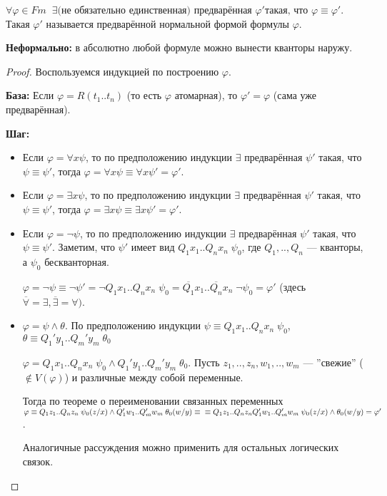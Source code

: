 \documentclass[a4paper, fleqn]{article}
\begin{document}
    \begin{theorem}
        $\forall \varphi \in Fm \;\; \exists \text{(не обязательно единственная) предварённая } \varphi' \text{такая, что } \varphi \equiv \varphi'$. Такая $\varphi'$ называется предварённой нормальной формой формулы $\varphi$.
    \end{theorem}
\vspace{-\baselineskip}
    \textbf{Неформально:} в абсолютно любой формуле можно вынести кванторы наружу.
\vspace{-\baselineskip}
    \begin{proof}
        Воспользуемся индукцией по построению $\varphi$.
        
        \textbf{База: } Если $\varphi = R(t_1..t_n)$ (то есть $\varphi$ атомарная), то $\varphi' = \varphi$ (сама уже предварённая). 
        
        \textbf{Шаг:}
        \begin{itemize}
        \item Если $\varphi = \forall x \psi$, то по предположению индукции $\exists$ предварённая $\psi'$ такая, что $\psi \equiv \psi'$, тогда $\varphi = \forall x \psi \equiv \forall x \psi' = \varphi'$. 
        \item Если $\varphi = \exists x \psi$, то по предположению индукции $\exists$ предварённая $\psi'$ такая, что $\psi \equiv \psi'$, тогда $\varphi = \exists x \psi \equiv \exists x \psi' = \varphi'$. 
        \item Если $\varphi = \neg \psi$, то по предположению индукции $\exists$ предварённая $\psi'$ такая, что $\psi \equiv \psi'$. Заметим, что $\psi'$ имеет вид $Q_1x_1..Q_nx_n \; \psi_0$, где $Q_1,..,Q_n$ --- кванторы, а $\psi_0$ бескванторная.
        
        $\varphi = \neg \psi \equiv \neg \psi' = \neg Q_1x_1..Q_nx_n \; \psi_0 = \overline{Q_1}x_1..\overline{Q_n}x_n \; \neg \psi_0 = \varphi'$ (здесь $\overline{\forall} = \exists, \overline{\exists} = \forall)$.
        \item $\varphi = \psi \wedge \theta$. По предположению индукции $\psi \equiv Q_1x_1..Q_nx_n \; \psi_0$, $\theta \equiv Q_1'y_1..Q_m'y_m \; \theta_0$
        
        $\varphi = Q_1x_1..Q_nx_n \; \psi_0 \wedge Q_1'y_1..Q_m'y_m \; \theta_0$. Пусть $z_1, .., z_n, w_1, .., w_m$ --- ''свежие''{} ($\notin V(\varphi)$) и различные между собой переменные. 
        
        Тогда по теореме о переименовании связанных переменных $\varphi \equiv  Q_1z_1..Q_nz_n \; \psi_0(z/x) \wedge Q_1'w_1..Q_m'w_m \; \theta_0(w/y) \equiv \\ \equiv Q_1z_1..Q_nz_n Q_1'w_1..Q_m'w_m \; \psi_0(z/x) \wedge \theta_0(w/y) = \varphi'$.
        
        Аналогичные рассуждения можно применить для остальных логических связок.
        \end{itemize}
    \end{proof}
\end{document}
